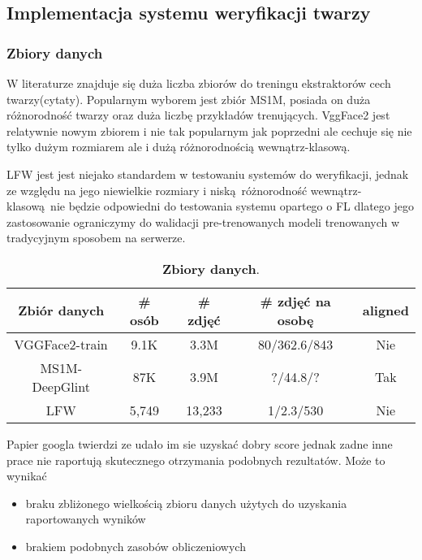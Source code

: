

\subsection{Implementacja systemu weryfikacji twarzy}

\subsubsection{Zbiory danych}

W literaturze znajduje się duża liczba zbiorów do treningu ekstraktorów cech twarzy(cytaty).
Popularnym wyborem jest zbiór MS1M, posiada on duża różnorodność twarzy oraz duża liczbę
przykładów trenujących. VggFace2 jest relatywnie nowym zbiorem i nie tak popularnym jak poprzedni
ale cechuje się nie tylko dużym rozmiarem ale i dużą różnorodnością wewnątrz-klasową.

LFW jest jest niejako standardem w testowaniu systemów do weryfikacji, jednak ze względu na jego niewielkie rozmiary i niską różnorodność wewnątrz-klasową nie będzie odpowiedni do testowania systemu opartego o FL dlatego jego zastosowanie ograniczymy do walidacji pre-trenowanych  modeli trenowanych w tradycyjnym sposobem na serwerze.



\begin{table}[h]
\begin{center}
\begin{tabular}{c|c|c|c|c}
\hline
Zbiór danych  & \# osób   &   \# zdjęć  &   \# zdjęć na osobę   &   aligned \\
\hline
VGGFace2-train \cite{DatasetVGGFace2}     & 9.1K & 3.3M & 80/362.6/843 & Nie  \\ 
MS1M-DeepGlint \cite{DatasetGlintweb}   & 87K  & 3.9M & ?/44.8/? & Tak \\
\hline
\hline
LFW \cite{DatasetLFW}   & 5,749  & 13,233 & 1/2.3/530 & Nie \\
\hline
\end{tabular}
\end{center}
\caption{\textbf{Zbiory danych}.}
\label{table:dataset}
\vspace{-4mm}
\end{table}


Papier googla twierdzi ze udało im sie uzyskać dobry score jednak zadne inne prace nie
raportują skutecznego otrzymania podobnych rezultatów. Może to wynikać
\begin{itemize}
    \item braku zbliżonego wielkością zbioru danych użytych do uzyskania raportowanych wyników
    \item brakiem podobnych zasobów obliczeniowych
\end{itemize}

